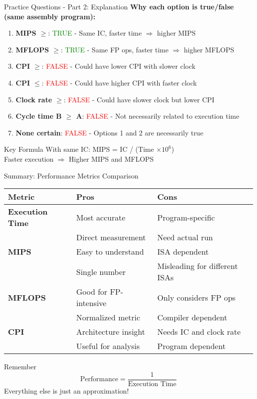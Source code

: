 \documentclass[aspectratio=169,12pt]{beamer}
\begin{document}
\begin{frame}{Practice Questions - Part 2: Explanation}
\textbf{Why each option is true/false (same assembly program):}

\begin{enumerate}
    \item \textbf{MIPS $\geq$}: \textcolor{green}{TRUE} - Same IC, faster time $\Rightarrow$ higher MIPS
    \item \textbf{MFLOPS $\geq$}: \textcolor{green}{TRUE} - Same FP ops, faster time $\Rightarrow$ higher MFLOPS
    \item \textbf{CPI $\geq$}: \textcolor{red}{FALSE} - Could have lower CPI with slower clock
    \item \textbf{CPI $\leq$}: \textcolor{red}{FALSE} - Could have higher CPI with faster clock
    \item \textbf{Clock rate $\geq$}: \textcolor{red}{FALSE} - Could have slower clock but lower CPI
    \item \textbf{Cycle time B $\geq$ A}: \textcolor{red}{FALSE} - Not necessarily related to execution time
    \item \textbf{None certain}: \textcolor{red}{FALSE} - Options 1 and 2 are necessarily true
\end{enumerate}

\begin{block}{Key Formula}
With same IC: MIPS = IC / (Time $\times 10^6$) \\
Faster execution $\Rightarrow$ Higher MIPS and MFLOPS
\end{block}
\end{frame}

\begin{frame}{Summary: Performance Metrics Comparison}
\begin{table}[h]
\centering
\begin{tabular}{lll}
\toprule
\textbf{Metric} & \textbf{Pros} & \textbf{Cons} \\
\midrule
\textbf{Execution Time} & Most accurate & Program-specific \\
& Direct measurement & Need actual run \\
\midrule
\textbf{MIPS} & Easy to understand & ISA dependent \\
& Single number & Misleading for different ISAs \\
\midrule
\textbf{MFLOPS} & Good for FP-intensive & Only considers FP ops \\
& Normalized metric & Compiler dependent \\
\midrule
\textbf{CPI} & Architecture insight & Needs IC and clock rate \\
& Useful for analysis & Program dependent \\
\bottomrule
\end{tabular}
\end{table}

\begin{block}{Remember}
$$\text{Performance} = \frac{1}{\text{Execution Time}}$$
Everything else is just an approximation!
\end{block}
\end{frame}
\end{document}

